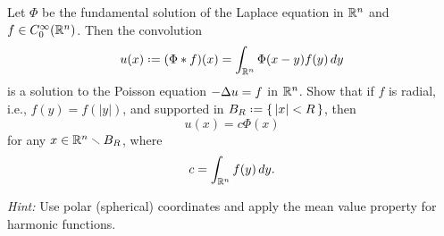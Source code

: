 \begin{problem}
  Let \(\Phi\) be the fundamental solution of the Laplace equation in
  \(\mathbb{R}^n\) and \(f\in C_0^\infty(\mathbb{R}^n)\). Then the convolution
  \[
    u(x)\defeq(\Phi* f)(x)=\int_{\R^n}\Phi(x-y)f(y)\diff y
  \]
  is a solution to the Poisson equation \(-\Delta u=f\) in \(\mathbb{R}^n\). Show
  that if \(f\) is radial, i.e., \(f(y)=f(|y|)\), and supported in
  \(B_R\defeq\{\,|x|<R\,\}\), then
  \[
    u(x)=c\Phi(x)
  \]
  for any \(x\in\mathbb{R}^n\smallsetminus B_R\), where
  \[
    c=\int_{\mathbb{R}^n}f(y)\mathop{}\!d y.
  \]

  \noindent\emph{Hint:} Use polar (spherical) coordinates and apply the mean value
  property for harmonic functions.
\end{problem}
\begin{solution*}
\end{solution*}

